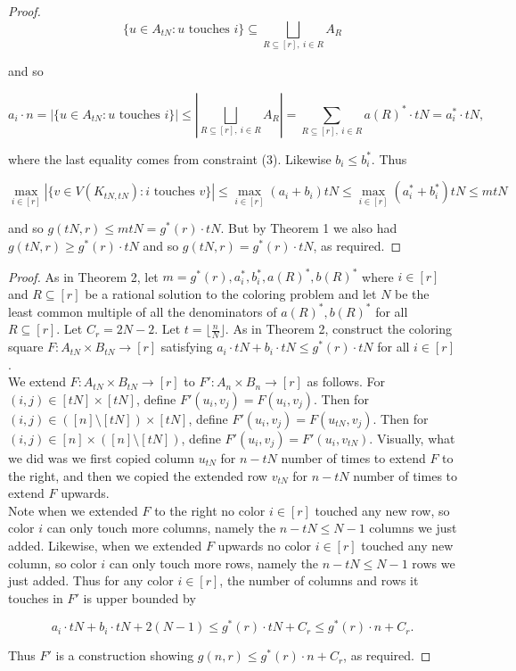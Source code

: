 \documentclass{article}
\begin{document}
\begin{proof}
$$\{u \in A_{tN} : u \text{ touches } i \} \subseteq \bigsqcup_{R \subseteq [r], \ i \in R} A_R$$

\noindent
and so 

$$a_i \cdot n = |\{u \in A_{tN} : u \text{ touches } i \}| \leq |\bigsqcup_{R \subseteq [r], \ i \in R} A_R|  = \sum_{R \subseteq [r], \ i \in R} a(R)^* \cdot tN= a_i^* \cdot tN,$$

\noindent
where the last equality comes from constraint (3). Likewise $b_i \leq b_i^*$. Thus

$$\max_{i \in [r]} |\{v \in V(K_{tN,tN}) : i \text{ touches } v\}| \leq \max_{i \in [r]} (a_i+b_i)tN \leq \max_{i \in [r]} (a_i^*+b_i^*)tN \leq mtN $$

\noindent
and so $g(tN,r) \leq mtN = g^*(r) \cdot tN$. But by Theorem 1 we also had $g(tN,r) \geq g^*(r) \cdot tN$ and so $g(tN,r) = g^*(r) \cdot tN$, as required. 
\end{proof}

\computeupper*

\begin{proof}
As in Theorem 2, let $m=g^*(r),a_i^*,b_i^*,a(R)^*,b(R)^*$ where $i \in [r]$ and $R \subseteq [r]$ be a rational solution to the coloring problem and let $N$ be the least common multiple of all the denominators of $a(R)^*,b(R)^*$ for all $R \subseteq [r]$. Let $C_r = 2N-2$.  Let $t = \lfloor \frac{n}{N} \rfloor$. As in Theorem 2, construct the coloring square $F : A_{tN} \times B_{tN} \rightarrow [r]$ satisfying $a_i \cdot tN +b_i \cdot tN \leq  g^*(r) \cdot tN$ for all $i \in [r]$. \\

We extend $F : A_{tN} \times B_{tN} \rightarrow [r]$ to $F' : A_{n} \times B_{n} \rightarrow [r]$ as follows. For $(i,j) \in [tN] \times [tN]$, define $F'(u_i,v_j) = F(u_i,v_j)$. Then for $(i,j) \in ([n] \setminus [tN]) \times [tN]$, define $F'(u_i,v_j) = F(u_{tN},v_j)$. Then for $(i,j) \in [n] \times ([n] \setminus [tN])$, define $F'(u_i,v_j) = F'(u_i,v_{tN})$. Visually, what we did was we first copied column $u_{tN}$ for $n-tN$ number of times to extend $F$ to the right, and then we copied the extended row $v_{tN}$ for $n-tN$ number of times to extend $F$ upwards. \\

Note when we extended $F$ to the right no color $i \in [r]$ touched any new row, so color $i$ can only touch more columns, namely the $n-tN \leq N-1$ columns we just added. Likewise, when we extended $F$ upwards no color $i \in [r]$ touched any new column, so color $i$ can only touch more rows, namely the $n-tN \leq N-1$ rows we just added. Thus for any color $i \in [r]$, the number of columns and rows it touches in $F'$ is upper bounded by 

$$a_i \cdot tN +b_i \cdot tN + 2(N-1)\leq g^*(r) \cdot tN + C_r \leq g^*(r) \cdot n + C_r.$$

\noindent
Thus $F'$ is a construction showing $g(n,r) \leq g^*(r) \cdot n + C_r$, as required.
\end{proof}
\end{document}
